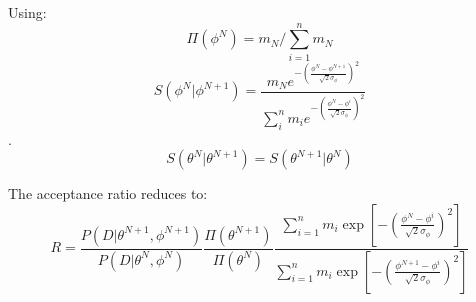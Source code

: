 \documentclass{article}
\begin{document}
Using:
$$\Pi(\phi^N) = m_N / \sum_{i=1}^n m_N$$
$$S(\phi^N | \phi^{N+1}) =\dfrac{ m_N   e^{  -\left(\tfrac{\phi^N - \phi^{N+1}}{\sqrt{2}\sigma_{\phi}}\right)^2     }}{\sum_i^{n} m_i e^{  -\left(\tfrac{\phi^N - \phi^{i}}{\sqrt{2}\sigma_{\phi}}\right)^2}}$$.
$$S(\theta^N | \theta^{N+1}) = S(\theta^{N+1} | \theta^{N})$$

The acceptance ratio reduces to:
\[
\boxed{
R= \dfrac{P(D | \theta^{N+1},\phi^{N+1})}{P(D | \theta^{N},\phi^{N})}   \dfrac{\Pi(\theta^{N+1})}{ \Pi(\theta^{N})} \dfrac{\sum_{i=1}^{n} m_i \exp \left[  -\left(\tfrac{\phi^{N} - \phi^{i}}{\sqrt{2}\sigma_{\phi}}\right)^2 \right] } {\sum_{i=1}^{n} m_i \exp \left[  -\left(\tfrac{\phi^{N+1} - \phi^i}{\sqrt{2}\sigma_{\phi}}\right)^2 \right]}
}
\]
\end{document}

